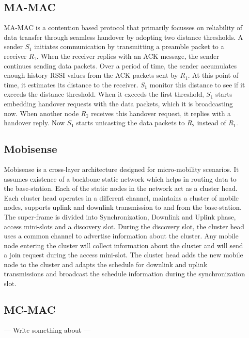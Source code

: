 \documentclass[a4paper, conference, 10pt]{IEEEtran}
\begin{document}
{\subsection{MA-MAC}
MA-MAC \cite{ma-mac} is a contention based protocol that primarily focusses on reliability of data transfer through seamless handover by adopting two distance thresholds. A sender \emph{$S_1$} initiates communication by transmitting a preamble packet to a receiver \emph{$R_1$}. When the receiver replies with an ACK message, the sender continues sending data packets. Over a period of time, the sender accumulates enough history RSSI values from the ACK packets sent by \emph{$R_1$}. At this point of time, it estimates its distance to the receiver. \emph{$S_1$} monitor this distance to see if it exceeds the distance threshold. When it exceeds the first threshold, \emph{$S_1$} starts embedding handover requests with the data packets, which it is broadcasting now. When another node \emph{$R_2$} receives this handover request, it replies with a handover reply. Now \emph{$S_1$} starts unicasting the data packets to \emph{$R_2$} instead of \emph{$R_1$}.  
 
\subsection{Mobisense}
Mobisense \cite{mobisense} is a cross-layer architecture designed for micro-mobility scenarios. It assumes existence of a backbone static network which helps in routing data to the base-station. Each of the static nodes in the network act as a cluster head. Each cluster head operates in a different channel, maintains a cluster of mobile nodes, supports uplink and downlink transmission to and from the base-station. The super-frame is divided into Synchronization, Downlink and Uplink phase, access mini-slots and a discovery slot. During the discovery slot, the cluster head uses a common channel to  advertise information about the cluster. Any mobile node entering the cluster will collect information about the cluster and will send a join request during the access mini-slot. The cluster head adds the new mobile node to the cluster and adapts the schedule for downlink and uplink transmissions and broadcast the schedule information during the synchronization slot.  

\subsection{MC-MAC}
--- Write something about \cite{mc-mac} ---\\ \\

} 
\end{document}
